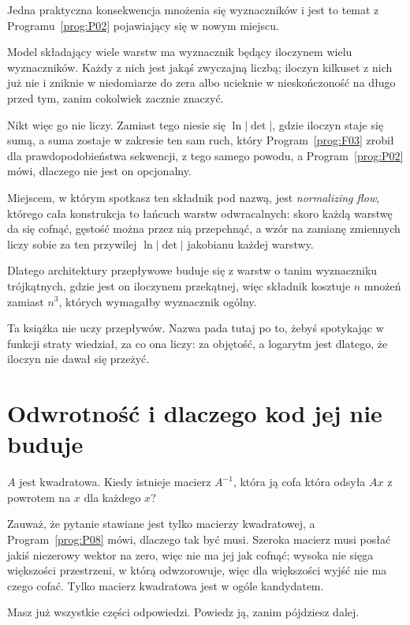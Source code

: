 \begin{fr}
Jedna praktyczna konsekwencja mnożenia się wyznaczników \dash{} i jest to temat
z Programu~\ref{prog:P02} pojawiający się w nowym miejscu.

Model składający wiele warstw ma wyznacznik będący iloczynem wielu
wyznaczników. Każdy z nich jest jakąś zwyczajną liczbą; iloczyn kilkuset z nich
już nie i zniknie w niedomiarze do zera albo ucieknie w nieskończoność na długo
przed tym, zanim cokolwiek zacznie znaczyć.

Nikt więc go nie liczy. Zamiast tego niesie się $\ln \lvert \det \rvert$, gdzie
iloczyn staje się sumą, a suma zostaje w zakresie \dash{} ten sam ruch, który
Program~\ref{prog:F03} zrobił dla prawdopodobieństwa sekwencji, z tego samego
powodu, a Program~\ref{prog:P02} mówi, dlaczego nie jest on opcjonalny.
\end{fr}

\begin{aibox}
Miejscem, w którym spotkasz ten składnik pod nazwą, jest \emph{normalizing
flow}, którego cała konstrukcja to łańcuch warstw odwracalnych: skoro każdą
warstwę da się cofnąć, gęstość można przez nią przepchnąć, a wzór na zamianę
zmiennych liczy sobie za ten przywilej $\ln \lvert \det \rvert$ jakobianu
każdej warstwy.

Dlatego architektury przepływowe buduje się z warstw o tanim wyznaczniku
\dash{} trójkątnych, gdzie jest on iloczynem przekątnej, więc składnik kosztuje
$n$ mnożeń zamiast $n^{3}$, których wymagałby wyznacznik ogólny.

Ta książka nie uczy przepływów. Nazwa pada tutaj po to, żebyś spotykając
 w funkcji straty wiedział, za co ona liczy: za objętość, a
logarytm jest dlatego, że iloczyn nie dawał się przeżyć.
\end{aibox}

\section{Odwrotność i dlaczego kod jej nie buduje}
\label{sec:P09-inverse}

\begin{fr}
$A$ jest kwadratowa. Kiedy istnieje macierz $A^{-1}$, która ją cofa \dash{}
która odsyła $Ax$ z powrotem na $x$ dla każdego $x$?

Zauważ, że pytanie stawiane jest tylko macierzy kwadratowej, a
Program~\ref{prog:P08} mówi, dlaczego tak być musi. Szeroka macierz musi
posłać jakiś niezerowy wektor na zero, więc nie ma jej jak cofnąć; wysoka nie
sięga większości przestrzeni, w którą odwzorowuje, więc dla większości wyjść
nie ma czego cofać. Tylko macierz kwadratowa jest w ogóle kandydatem.

Masz już wszystkie części odpowiedzi. Powiedz ją, zanim pójdziesz dalej.
\dotline
\nextframe
\end{fr}

